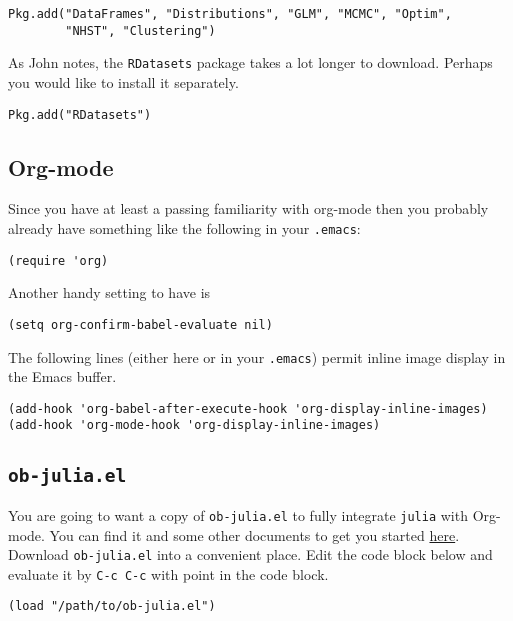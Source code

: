 \documentclass[11pt]{article}
\begin{document}
\begin{verbatim}
Pkg.add("DataFrames", "Distributions", "GLM", "MCMC", "Optim", 
        "NHST", "Clustering")
\end{verbatim}

As John notes, the \texttt{RDatasets} package takes a lot longer to download.  Perhaps you would like to install it separately.

\begin{verbatim}
Pkg.add("RDatasets")
\end{verbatim}
\subsection[Org-mode]{Org-mode}
\label{sec-1-4}

Since you have at least a passing familiarity with org-mode then you probably already have something like the following in your \texttt{.emacs}:

\begin{verbatim}
(require 'org)
\end{verbatim}

Another handy setting to have is

\begin{verbatim}
(setq org-confirm-babel-evaluate nil)
\end{verbatim}

The following lines (either here or in your \texttt{.emacs}) permit inline image display in the Emacs buffer.

\begin{verbatim}
(add-hook 'org-babel-after-execute-hook 'org-display-inline-images)   
(add-hook 'org-mode-hook 'org-display-inline-images)
\end{verbatim}
\subsection[\texttt{ob-julia.el}]{\texttt{ob-julia.el}}
\label{sec-1-5}

You are going to want a copy of \texttt{ob-julia.el} to fully integrate \texttt{julia} with Org-mode.  You can find it and some other documents to get you started \href{https://github.com/gjkerns/ob-julia}{here}.  Download \texttt{ob-julia.el} into a convenient place.  Edit the code block below and evaluate it by \texttt{C-c C-c} with point in the code block.

\begin{verbatim}
(load "/path/to/ob-julia.el")
\end{verbatim}
\end{document}
